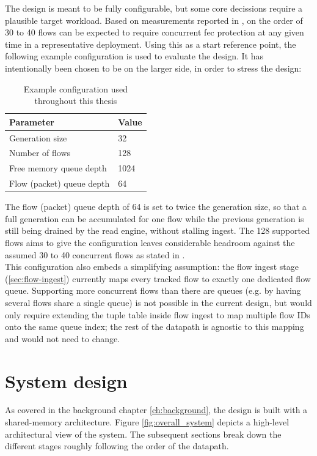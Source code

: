 The design is meant to be fully configurable, but some core decissions require a plausible 
target workload.  Based on measurements reported in \cite{alizadeh2010dctcp},
on the order of 30 to 40 flows can be expected to require concurrent \gls{fec} protection at any given time in a
representative deployment. Using this as a start reference point, the following example configuration is used
to evaluate the design. It has intentionally been chosen to be on the larger side, in order to
stress the design: \\

\begin{table}[h]
  \centering
  \begin{tabular}{ll}
    \hline
    Parameter & Value \\
    \hline
    Generation size            & 32 \\
    Number of flows            & 128 \\
    Free memory queue depth    & 1024 \\
    Flow (packet) queue depth  & 64 \\
    \hline
  \end{tabular}
  \caption{Example configuration used throughout this thesis}\label{tab:example-config}
\end{table}

The flow (packet) queue depth of 64 is set to twice the generation size, so that a full
generation can be accumulated for one flow while the previous generation is still being
drained by the read engine, without stalling ingest. The 128 supported flows aims to give 
the configuration leaves considerable headroom against the assumed 30 to 40 concurrent flows 
as stated in \cite{alizadeh2010dctcp}. \\

This configuration also embeds a simplifying assumption: the flow ingest stage
(\cref{sec:flow-ingest}) currently maps every tracked flow to exactly one dedicated flow
queue. Supporting more concurrent flows than there are queues (e.g. by having
several flows share a single queue) is not possible in the current design, but would only require
extending the tuple table inside flow ingest to map multiple flow IDs onto the same queue
index; the rest of the datapath is agnostic to this mapping and would not need to change.

\section{System design}
As covered in the background chapter \ref{ch:background}, the design is built with a shared-memory architecture. 
Figure \ref{fig:overall_system} depicts a high-level architectural view of the system. The subsequent 
sections break down the different stages roughly following the order of the datapath. \\

